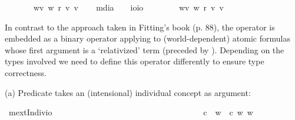 \begin{isabellebody}
\ \ \ \ \ {\isachardoublequoteopen}\isactrlbold {\isasymbox}{\isasymphi}\ {\isasymequiv}\ {\isasymlambda}w{\isachardot}{\isasymforall}v{\isachardot}\ {\isacharparenleft}w\ r\ v{\isacharparenright}{\isasymlongrightarrow}{\isacharparenleft}{\isasymphi}\ v{\isacharparenright}{\isachardoublequoteclose}\isanewline
\ \ \isamarkupfalse%
\ mdia\ \ \ {\isacharcolon}{\isacharcolon}\ {\isachardoublequoteopen}io{\isasymRightarrow}io{\isachardoublequoteclose}\ {\isacharparenleft}{\isachardoublequoteopen}\isanewline
\ \ \ \ \ {\isachardoublequoteopen}\isactrlbold {\isasymdiamond}{\isasymphi}\ {\isasymequiv}\ {\isasymlambda}w{\isachardot}{\isasymexists}v{\isachardot}\ {\isacharparenleft}w\ r\ v{\isacharparenright}{\isasymand}{\isacharparenleft}{\isasymphi}\ v{\isacharparenright}{\isachardoublequoteclose}%
\isamarkuptrue%
%
\begin{isamarkuptext}%
In contrast to the approach taken in Fitting's book (p. 88), the \isa{{\isasymdown}} operator is embedded as a binary operator
 applying to (world-dependent) atomic formulas whose first argument is a `relativized' term (preceded by \isa{{\isasymdown}}).
 Depending on the types involved we need to define this operator differently to ensure type correctness.%
\end{isamarkuptext}\isamarkuptrue%
%
\begin{isamarkuptext}%
(a) Predicate \isa{{\isasymphi}} takes an (intensional) individual concept as argument:%
\end{isamarkuptext}\isamarkuptrue%
\isamarkupfalse%
\ mextIndiv{\isacharcolon}{\isacharcolon}{\isachardoublequoteopen}{\isasymup}{\isasymlangle}{\isasymzero}{\isasymrangle}{\isasymRightarrow}{\isasymup}{\isasymzero}{\isasymRightarrow}io{\isachardoublequoteclose}\ {\isacharparenleft}\ {\isachardoublequoteopen}\isactrlbold {\isasymdownharpoonleft}{\isachardoublequoteclose}\ {}{}{\isacharparenright}\ \ \ \ \ \ \ \ \ \ \ \ \ \ \ \ \ \ \ \ \ \ \ \ \ \ \ \ \ \isanewline
\ \ \ {\isachardoublequoteopen}{\isasymphi}\ \isactrlbold {\isasymdownharpoonleft}c\ {\isasymequiv}\ {\isasymlambda}w{\isachardot}\ {\isasymphi}\ {\isacharparenleft}c\ w{\isacharparenright}\ w{\isachardoublequoteclose}%

\end{isabellebody}
